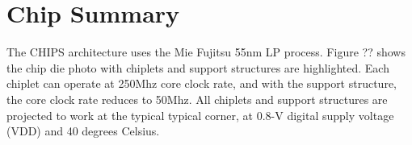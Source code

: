\documentclass[../main.tex]{subfiles}
\begin{document}
\section{Chip Summary}

The CHIPS architecture uses the Mie Fujitsu 55nm LP process. Figure ?? shows the chip die photo with chiplets and support structures are highlighted. Each chiplet can operate at 250Mhz core clock rate, and with the support structure, the core clock rate reduces to 50Mhz. All chiplets and support structures are projected to work at the typical typical corner, at 0.8-V digital supply voltage (VDD) and 40 degrees Celsius. 

\end{document}
